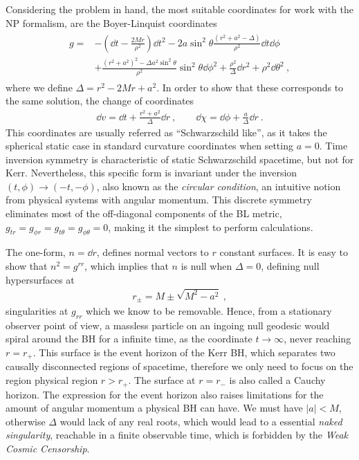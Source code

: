 Considering the problem in hand, the most suitable coordinates for work with the NP formalism, are the Boyer-Linquist coordinates
\begin{align}
    \begin{split}
        g = &- \left(\dd t - \frac{2 M r}{\rho^2} \right) \dd t^2 - 2 a \sin^2\theta \frac{(r^2+a^2-\Delta)}{\rho^2} \dd t \dd \phi \\
        &+ \frac{(r^2+a^2)^2- \Delta a^2 \sin^2\theta}{\rho^2} \sin^2\theta \dd\phi^2 + \frac{\rho^2}{\Delta} \dd r^2 + \rho^2 \dd \theta^2 ~,
    \end{split}
    \label{eq2:KerrBL}
\end{align}
where we define $\Delta=r^2-2 M r + a^2$. In order to show that these corresponds to the same solution, the change of coordinates
\begin{align}
    \dd v= \dd t + \frac{r^2+a^2}{\Delta} \dd r ~, \qquad \dd\chi = \dd\phi + \frac{a}{\Delta} \dd r ~.
    \label{eq2:InEFtoBL}
\end{align}
This coordinates are usually referred as ``Schwarzschild like'', as it takes the spherical static case in standard curvature coordinates when setting $a=0$. 
Time inversion symmetry is characteristic of static Schwarzschild spacetime, but not for Kerr. 
Nevertheless, this specific form is invariant under the inversion $(t,\phi)\to(-t,-\phi)$, also known as the \emph{circular condition}, an intuitive notion from physical systems with angular momentum. 
This discrete symmetry eliminates most of the off-diagonal components of the BL metric, $g_{tr} = g_{\phi r} = g_{t \theta} = g_{\phi \theta} = 0$, making it the simplest to perform calculations.

The one-form, $n = \dd r$, defines normal vectors to $r$ constant surfaces. It is easy to show that $n^2 = g^{rr}$, which implies that $n$ is null when $\Delta=0$, defining null hypersurfaces at 
\begin{align}
    r_\pm = M \pm \sqrt{M^2 - a^2} ~,
    \label{eq2:KerrRadius}
\end{align}
singularities at $g_{rr}$ which we know to be removable.
Hence, from a stationary observer point of view, a massless particle on an ingoing null geodesic would spiral around the BH for a infinite time, as the coordinate $t\to\infty$, never reaching $r=r_{+}$.
This surface is the event horizon of the Kerr BH, which separates two causally disconnected regions of spacetime, therefore we only need to focus on the region physical region $r>r_{+}$. The surface at $r=r_{-}$ is also called a Cauchy horizon.
The expression for the event horizon also raises limitations for the amount of angular momentum a physical BH can have. We must have $|a| < M$, otherwise $\Delta$ would lack of any real roots, which would lead to a essential \emph{naked singularity}, reachable in a finite observable time, which is forbidden by the \emph{Weak Cosmic Censorship}.   

